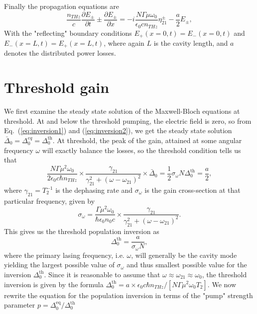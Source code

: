 \documentclass[preprint,secnumarabic,amssymb, nobibnotes, aip, prd]{revtex4-1}
\begin{document}
Finally the propagation equations are
\begin{equation}
\frac{n_{THz}}{c}\frac{\partial E_{\pm}}{\partial {t}}\pm\frac{\partial E_{\pm}}{\partial {x}}=-i\frac{N\Gamma\mu\omega_0}{\epsilon_0 c n_{THz}}\eta_{21}^{\pm}-\frac{a}{2}E_{\pm
}, \label{eq:rtwave}%
\end{equation}	
With the "reflecting" boundary conditions $E_+(x=0,t)=E_-(x=0,t)$ and $E_-(x=L,t)=E_+(x=L,t)$, where again $L$ is the cavity length, and $a$ denotes the distributed power losses. 


\section{Threshold gain}

We first examine the steady state solution of the Maxwell-Bloch equations at threshold. At and below the threshold pumping, the electric field is zero, so from Eq.~(\ref{eq:inversion1}) and (\ref{eq:inversion2}), we get the steady state solution $\bar{\Delta}_0 = \Delta_{0}^{eq} = \Delta_0^{\text{th}}$. At threshold, the peak of the gain, attained at some angular frequency $\omega$ will exactly balance the losses, so the threshold condition tells us that
\begin{equation}
\label{eq:gain-loss-threshold}
\frac{N\Gamma\mu^2\omega_0}{2 \epsilon_0 c \hbar n_{THz}}\times\frac{\gamma_{21}}{\gamma_{21}^2+(\omega-\omega_{21})^2}\times\bar{\Delta}_0 =\frac{1}{2}\sigma_\omega N \Delta_0^{\text{th}} = \frac{a}{2},
\end{equation}
where $\gamma_{21} = T_2^{-1}$ is the dephasing rate and $\sigma_\omega$ is the gain cross-section at that particular frequency, given by
\begin{equation}
\label{eq:cross-section}
\sigma_\omega = \frac{\Gamma \mu^2\omega_{0}}{\hbar\epsilon_0n_0c}\times\frac{\gamma_{21}}{\gamma_{21}^2+(\omega-\omega_{21})^2}.
\end{equation}
This gives us the threshold population inversion as 
\begin{equation}
\label{eq:threshold-inversion}
\Delta_0^{\text{th}} = \frac{a}{\sigma_{\omega}N}, 
\end{equation}
where the primary lasing frequency, i.e. $\omega$, will generally be the cavity mode yielding the largest possible value of $\sigma_\omega$ and thus smallest possible value for the inversion $\Delta_{0}^{\text{th}}$. Since it is reasonable to assume that $\omega \approx \omega_{21}\approx\omega_0$, the threshold inversion is given by the formula $\Delta_0^{\text{th}} = a \times \epsilon_0 c \hbar n_{THz}/\left [N\Gamma\mu^2\omega_0 T_2\right ]$.
We now rewrite the equation for the population inversion in terms of the "pump" strength parameter $p=\Delta_0^{\text{eq}}/\Delta_0^{\text{th}}$
\end{document}
